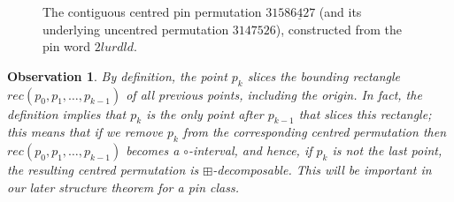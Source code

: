 \documentclass[11pt,a4paper]{article}
\newcommand{\plotptradius}{4pt}
\newtheorem{obs}[thm]{Observation}
\theoremstyle{definition}
\begin{document}
\begin{figure}[h]
\begin{center}
\end{center}
\caption{The contiguous centred pin permutation $31586\underline{4}27$ (and its underlying uncentred permutation $3147526$), constructed from the pin word $2lurdld$.}
\label{fig:pinpermexample}
\end{figure}

\begin{obs} \label{slicing}
By definition, the point $p_{k}$ slices the bounding rectangle $rec(p_{0},p_{1}, \dots , p_{k-1})$ of all previous points, including the origin. In fact, the definition implies that $p_{k}$ is the \emph{only} point after $p_{k-1}$ that slices this rectangle; this means that if we remove $p_{k}$ from the corresponding centred permutation then $rec(p_{0},p_{1}, \dots , p_{k-1})$ becomes a $\circ$-interval, and hence, if $p_{k}$ is not the last point, the resulting centred permutation is $\boxplus$-decomposable. This will be important in our later structure theorem for a pin class.
\end{obs}
\end{document}
